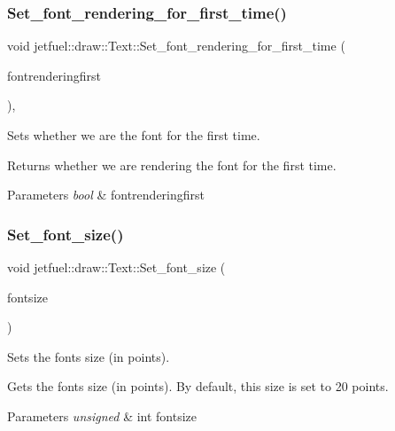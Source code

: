 \subsubsection{\texorpdfstring{Set\+\_\+font\+\_\+rendering\+\_\+for\+\_\+first\+\_\+time()}{Set\_font\_rendering\_for\_first\_time()}}
{\footnotesize\ttfamily void jetfuel\+::draw\+::\+Text\+::\+Set\+\_\+font\+\_\+rendering\+\_\+for\+\_\+first\+\_\+time (\begin{DoxyParamCaption}\item[{bool}]{fontrenderingfirst }\end{DoxyParamCaption})\hspace{0.3cm}{\ttfamily [inline]}, {\ttfamily [protected]}}



Sets whether we are the font for the first time. 

Returns whether we are rendering the font for the first time.


\begin{DoxyParams}{Parameters}
{\em bool} & fontrenderingfirst \\
\hline
\end{DoxyParams}
\mbox{\label{classjetfuel_1_1draw_1_1Text_a488868c8aa0fcc692cd7a37b8abe13f2}} 
\subsubsection{\texorpdfstring{Set\+\_\+font\+\_\+size()}{Set\_font\_size()}}
{\footnotesize\ttfamily void jetfuel\+::draw\+::\+Text\+::\+Set\+\_\+font\+\_\+size (\begin{DoxyParamCaption}\item[{const unsigned int}]{fontsize }\end{DoxyParamCaption})\hspace{0.3cm}{\ttfamily [inline]}}



Sets the font\textquotesingle{}s size (in points). 

Gets the font\textquotesingle{}s size (in points). By default, this size is set to 20 points.


\begin{DoxyParams}{Parameters}
{\em unsigned} & int fontsize \\
\hline
\end{DoxyParams}
\mbox{\label{classjetfuel_1_1draw_1_1Text_aec048bedd8cacb8523c4b2a3121f4179}} 
